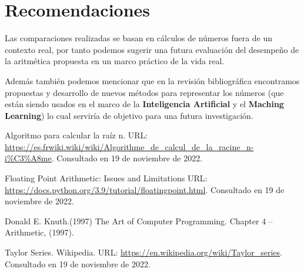 \documentclass[a4paper,10pt,twocolumn]{article}
\begin{document}
\section{Recomendaciones}\label{sec:rec}

Las comparaciones realizadas se basan en cálculos de números fuera de un contexto real, por tanto podemos sugerir una futura evaluación del desempeño de la aritmética propuesta en un marco práctico de la vida real.

Además también podemos mencionar que en la revisión bibliográfica encontramos propuestas y desarrollo de nuevos métodos para representar los números (que están siendo usados en el marco de la  \textbf{Inteligencia Artificial} y el \textbf{Maching Learning}) lo cual serviría de objetivo para una futura investigación. 



\begin{thebibliography}{99}
	 Algoritmo para calcular la raíz n. URL: \href{https://es.frwiki.wiki/wiki/Algorithme_de_calcul_de_la_racine_n-i\%C3\%A8me}
	{https://es.frwiki.wiki/wiki/Algorithme\_de\_calcul\_de\_la\_racine\_n-i\%C3\%A8me}.
	Consultado en 19 de noviembre de 2022.
	
	 Floating Point Arithmetic: Issues and Limitations URL: \href{https://docs.python.org/3.9/tutorial/floatingpoint.html}
	{https://docs.python.org/3.9/tutorial/floatingpoint.html}.
	Consultado en 19 de noviembre de 2022.
	
	 Donald E. Knuth.(1997) The Art of Computer Programming. Chapter 4 – Arithmetic, (1997).	
	
	 Taylor Series. Wikipedia. URL: \href{https://en.wikipedia.org/wiki/Taylor_series}
	{https://en.wikipedia.org/wiki/Taylor\_series}.
	Consultado en 19 de noviembre de 2022.
	
	
	
	
	
	
\end{thebibliography}


\label{end}
\end{document}
